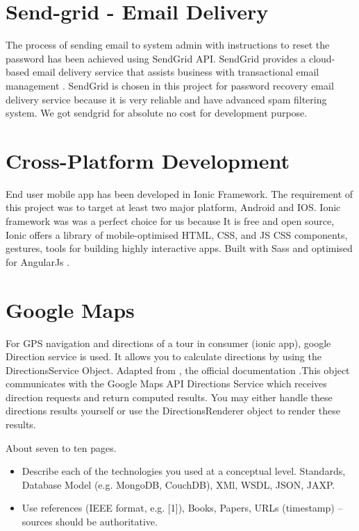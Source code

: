 		
		\section{Send-grid - Email Delivery}
		 The  process of sending email to system admin with instructions to reset the password has been achieved using SendGrid API. SendGrid provides a cloud-based email delivery service that assists business with transactional email management \cite{sendGrid}. SendGrid is chosen in this project for password recovery email delivery service because it is very reliable and have advanced spam filtering system. We got sendgrid for absolute no cost for development purpose. 
		 
		\section{Cross-Platform Development}
		End user mobile app has been developed in Ionic Framework.  The requirement of this project was to target at least two major platform, Android and IOS. Ionic framework was was a perfect choice for us because It is free and open source, Ionic offers a library of mobile-optimised HTML, CSS, and JS CSS components, gestures, tools for building highly interactive apps. Built with Sass and optimised for AngularJs \cite{expressRef}.
		
		\section{Google Maps}
		For GPS navigation and directions of a tour in consumer (ionic app), google Direction service is used. It allows you to calculate directions by using the DirectionsService Object. Adapted from \cite{GoogleMapDirection}, the official documentation .This object communicates with the Google Maps API Directions Service which receives direction requests and return computed results. You may either handle these directions results yourself or use the DirectionsRenderer object to render these results. 
		
	
About seven to ten pages.
\begin{itemize}
	\item Describe each of the technologies you used at a conceptual level. Standards, Database Model (e.g. MongoDB, CouchDB), XMl, WSDL, JSON, JAXP.
	\item Use references (IEEE format, e.g. [1]), Books, Papers, URLs (timestamp) – sources should be authoritative. 
\end{itemize}


